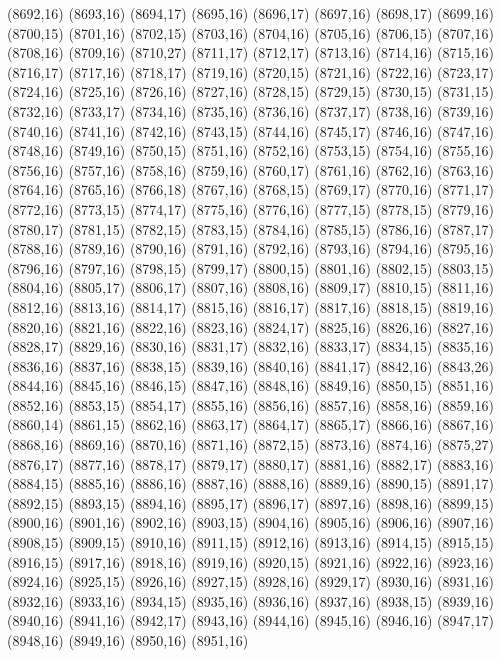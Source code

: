 (8692,16)
(8693,16)
(8694,17)
(8695,16)
(8696,17)
(8697,16)
(8698,17)
(8699,16)
(8700,15)
(8701,16)
(8702,15)
(8703,16)
(8704,16)
(8705,16)
(8706,15)
(8707,16)
(8708,16)
(8709,16)
(8710,27)
(8711,17)
(8712,17)
(8713,16)
(8714,16)
(8715,16)
(8716,17)
(8717,16)
(8718,17)
(8719,16)
(8720,15)
(8721,16)
(8722,16)
(8723,17)
(8724,16)
(8725,16)
(8726,16)
(8727,16)
(8728,15)
(8729,15)
(8730,15)
(8731,15)
(8732,16)
(8733,17)
(8734,16)
(8735,16)
(8736,16)
(8737,17)
(8738,16)
(8739,16)
(8740,16)
(8741,16)
(8742,16)
(8743,15)
(8744,16)
(8745,17)
(8746,16)
(8747,16)
(8748,16)
(8749,16)
(8750,15)
(8751,16)
(8752,16)
(8753,15)
(8754,16)
(8755,16)
(8756,16)
(8757,16)
(8758,16)
(8759,16)
(8760,17)
(8761,16)
(8762,16)
(8763,16)
(8764,16)
(8765,16)
(8766,18)
(8767,16)
(8768,15)
(8769,17)
(8770,16)
(8771,17)
(8772,16)
(8773,15)
(8774,17)
(8775,16)
(8776,16)
(8777,15)
(8778,15)
(8779,16)
(8780,17)
(8781,15)
(8782,15)
(8783,15)
(8784,16)
(8785,15)
(8786,16)
(8787,17)
(8788,16)
(8789,16)
(8790,16)
(8791,16)
(8792,16)
(8793,16)
(8794,16)
(8795,16)
(8796,16)
(8797,16)
(8798,15)
(8799,17)
(8800,15)
(8801,16)
(8802,15)
(8803,15)
(8804,16)
(8805,17)
(8806,17)
(8807,16)
(8808,16)
(8809,17)
(8810,15)
(8811,16)
(8812,16)
(8813,16)
(8814,17)
(8815,16)
(8816,17)
(8817,16)
(8818,15)
(8819,16)
(8820,16)
(8821,16)
(8822,16)
(8823,16)
(8824,17)
(8825,16)
(8826,16)
(8827,16)
(8828,17)
(8829,16)
(8830,16)
(8831,17)
(8832,16)
(8833,17)
(8834,15)
(8835,16)
(8836,16)
(8837,16)
(8838,15)
(8839,16)
(8840,16)
(8841,17)
(8842,16)
(8843,26)
(8844,16)
(8845,16)
(8846,15)
(8847,16)
(8848,16)
(8849,16)
(8850,15)
(8851,16)
(8852,16)
(8853,15)
(8854,17)
(8855,16)
(8856,16)
(8857,16)
(8858,16)
(8859,16)
(8860,14)
(8861,15)
(8862,16)
(8863,17)
(8864,17)
(8865,17)
(8866,16)
(8867,16)
(8868,16)
(8869,16)
(8870,16)
(8871,16)
(8872,15)
(8873,16)
(8874,16)
(8875,27)
(8876,17)
(8877,16)
(8878,17)
(8879,17)
(8880,17)
(8881,16)
(8882,17)
(8883,16)
(8884,15)
(8885,16)
(8886,16)
(8887,16)
(8888,16)
(8889,16)
(8890,15)
(8891,17)
(8892,15)
(8893,15)
(8894,16)
(8895,17)
(8896,17)
(8897,16)
(8898,16)
(8899,15)
(8900,16)
(8901,16)
(8902,16)
(8903,15)
(8904,16)
(8905,16)
(8906,16)
(8907,16)
(8908,15)
(8909,15)
(8910,16)
(8911,15)
(8912,16)
(8913,16)
(8914,15)
(8915,15)
(8916,15)
(8917,16)
(8918,16)
(8919,16)
(8920,15)
(8921,16)
(8922,16)
(8923,16)
(8924,16)
(8925,15)
(8926,16)
(8927,15)
(8928,16)
(8929,17)
(8930,16)
(8931,16)
(8932,16)
(8933,16)
(8934,15)
(8935,16)
(8936,16)
(8937,16)
(8938,15)
(8939,16)
(8940,16)
(8941,16)
(8942,17)
(8943,16)
(8944,16)
(8945,16)
(8946,16)
(8947,17)
(8948,16)
(8949,16)
(8950,16)
(8951,16)
